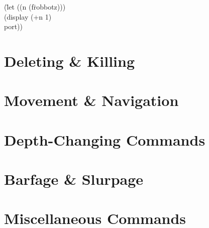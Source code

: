 \documentclass[landscape,a4paper]{article}
\newenvironment{nstabbing}
  {\setlength{\topsep}{-\parskip}%
   \setlength{\partopsep}{0.2em}%
   \tabbing}
  {\endtabbing}
\begin{document}
\begin{multicols}{4}
\begin{nstabbing}
(\=let ((n (f\=robbotz)))\\
\>\cursor (display (+n 1)\\
\>\>
port))
\end{nstabbing}
\rmfamily

    \section*{Deleting \& Killing}

    \section*{Movement \& Navigation}

    \section*{Depth-Changing Commands}

    \section*{Barfage \& Slurpage}

    \section*{Miscellaneous Commands}

  \end{multicols}
\end{document}
